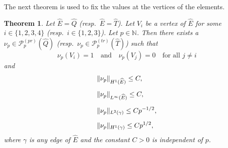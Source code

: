 \documentclass[english, 12pt, a4paper, sci, utf8, a-2b, online]{aaltothesis}
\theoremstyle{definition}
\theoremstyle{plain}
\newtheorem{theorem}{Theorem}[section]
\DeclarePairedDelimiter\norm{\lVert}{\rVert}
\numberwithin{equation}{section}
\begin{document}
The next theorem is used to fix the values at the vertices of the elements.
\begin{theorem}
    \label{thm:auxiliary_vertex}
    Let $\widehat{E} = \widehat{Q}$ (resp.\ $\widehat{E} = \widehat{T}$).
    Let $V_i$ be a vertex of $\widehat{E}$ for some $i \in \{1,2,3,4\}$
    (resp.\ $i \in \{1,2,3\}$). Let $p \in \mathbb{N}$.
    Then there exists a $\nu_p \in \mathcal{P}_p^{(pr)}(\widehat{Q})$
    (resp.\ $\nu_p \in \mathcal{P}_p^{(tr)}(\widehat{T})$) such that
    \begin{equation}
        \label{eq:auxiliary_vertex_vertices}
        \nu_p(V_i) = 1
        \quad \text{and} \quad
        \nu_p(V_j) = 0 \text{ } \text{ for all } j \neq i
    \end{equation}
    and
    \begin{align}
        \label{eq:auxiliary_vertex_res1}
        &\norm{\nu_p}_{H^1(\widehat{E})} \leq C, \\[0.5em]
        \label{eq:auxiliary_vertex_res2}
        &\norm{\nu_p}_{L^{\infty}(\widehat{E})} \leq C, \\[0.5em]
        \label{eq:auxiliary_vertex_res3}
        &\norm{\nu_p}_{L^2(\gamma)} \leq C p^{-1/2}, \\[0.5em]
        \label{eq:auxiliary_vertex_res4}
        &\norm{\nu_p}_{H^1(\gamma)} \leq C p^{1/2},
    \end{align}
    where $\gamma$ is any edge of $\widehat{E}$
    and the constant $C > 0$ is independent of $p$.
\end{theorem}
\end{document}
